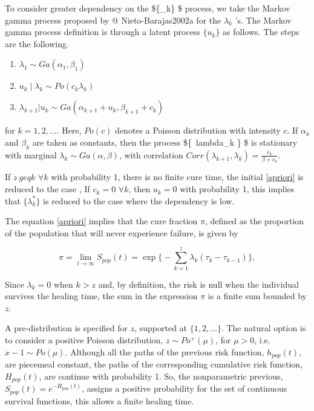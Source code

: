 \documentclass[
]{article}
\begin{document}
To consider greater dependency on the \$\{\lambda\_k\} \$ process, we
take the Markov gamma process proposed by @ Nieto-Barajas2002a for the
\(\lambda_k\) 's. The Markov gamma process definition is through a
latent process \(\{u_k\}\) as follows. The steps are the following.

\begin{enumerate}
\item $\lambda_1 \sim Ga(\alpha_1,\beta_1)$
\item $u_k \mid \lambda_k \sim Po(c_k \lambda_k)$
\item $\lambda_{k+1}|u_k \sim Ga(\alpha_{k+1}+u_k,\beta_{k+1} + c_k)$
\end{enumerate}

for \(k = 1,2, \dots\). Here, \(Po(c)\) denotes a Poisson distribution
with intensity \(c\). If \(\alpha_k\) and \(\beta_k\) are taken as
constants, then the process \$\{~lambda\_k \} \$ is stationary with
marginal \(\lambda_k \sim Ga(\alpha, \beta)\), with correlation
\(Corr(\lambda_{k + 1}, \lambda_k) = \frac{c_k}{\beta + c_k}\).

If \(z \ geq k\) \(\forall k\) with probability 1, there is no finite
cure time, the initial \eqref{apriori} is reduced to the case
\citet{Nieto-Barajas2002a}, If \(c_k = 0\) \(\forall k\), then
\(u_k = 0\) with probability 1, this implies that \(\{\lambda_k^*\}\) is
reduced to the case where the dependency is low.

The equation \eqref{apriori} implies that the cure fraction \(\pi\),
defined as the proportion of the population that will never experience
failure, is given by

\[
\pi=\lim\limits_{t\to\infty}S_{pop}(t)=\exp\bigg\{-\sum_{k=1}^z \lambda_k(\tau_k-\tau_{k-1})\bigg\},
\]

Since \(\lambda_k = 0\) when \(k> z\) and, by definition, the risk is
null when the individual survives the healing time, the sum in the
expression \(\pi\) is a finite sum bounded by \(z\).

A pre-distribution is specified for \(z\), supported at
\(\{1,2, \dots \}\). The natural option is to consider a positive
Poisson distribution, \(z \sim Po^+ (\mu)\), for \(\mu> 0\),
i.e.~\(x-1 \sim Po (\mu)\). Although all the paths of the previous risk
function, \(h_{pop}(t)\), are piecemeal constant, the paths of the
corresponding cumulative risk function, \(H_{pop} (t)\), are continue
with probability 1. So, the nonparametric previous,
\(S_{pop} (t) = e^{- H_{pop} (t)}\), assigns a positive probability for
the set of continuous survival functions, this allows a finite healing
time.
\end{document}
